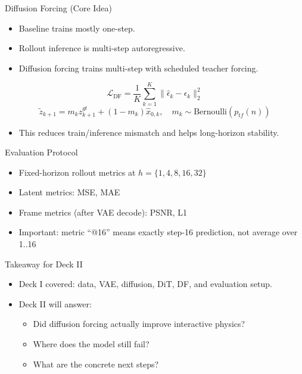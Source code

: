 \documentclass[aspectratio=169,11pt]{beamer}
\begin{document}
\begin{frame}{Diffusion Forcing (Core Idea)}
\begin{itemize}
  \item Baseline trains mostly one-step.
  \item Rollout inference is multi-step autoregressive.
  \item Diffusion forcing trains multi-step with scheduled teacher forcing.
\end{itemize}
\[
\mathcal{L}_{\text{DF}} = \frac{1}{K}\sum_{k=1}^K \|\hat\epsilon_k-\epsilon_k\|_2^2
\]
\[
\tilde z_{k+1}=m_k z_{k+1}^{gt} + (1-m_k)\hat x_{0,k},\quad m_k\sim \text{Bernoulli}(p_{tf}(n))
\]
\begin{itemize}
  \item This reduces train/inference mismatch and helps long-horizon stability.
\end{itemize}
\end{frame}

\begin{frame}{Evaluation Protocol}
\begin{itemize}
  \item Fixed-horizon rollout metrics at \(h=\{1,4,8,16,32\}\)
  \item Latent metrics: MSE, MAE
  \item Frame metrics (after VAE decode): PSNR, L1
  \item Important: metric ``@16'' means exactly step-16 prediction, not average over 1..16
\end{itemize}
\end{frame}

\begin{frame}{Takeaway for Deck II}
\begin{itemize}
  \item Deck I covered: data, VAE, diffusion, DiT, DF, and evaluation setup.
  \item Deck II will answer:
  \begin{itemize}
    \item Did diffusion forcing actually improve interactive physics?
    \item Where does the model still fail?
    \item What are the concrete next steps?
  \end{itemize}
\end{itemize}
\end{frame}
\end{document}
